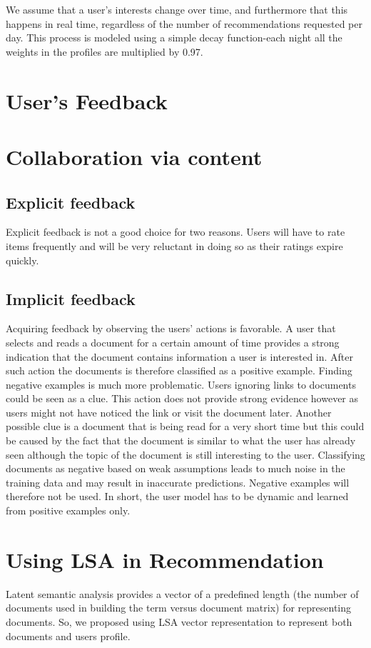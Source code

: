 We assume that a user's interests change over time, and furthermore that this happens in real time, regardless of the number of recommendations requested per day. This process is modeled using a simple decay function-each night all the weights in the profiles are multiplied by 0.97.
 
\section{User's Feedback}

\section{Collaboration via content}
\subsection{Explicit feedback}
Explicit feedback is not a good choice for two reasons. Users will have to rate items frequently and will be very reluctant in doing so as their ratings expire quickly.

\subsection{Implicit feedback}
Acquiring feedback by observing the users’ actions is favorable. A user that selects and reads a document for a certain amount of time provides a strong indication that the document contains information a user is interested in. After such action the documents is therefore classified as a positive example. Finding negative examples is much more problematic. Users ignoring links to documents could be seen as a clue. This action does not provide strong evidence however as users might not have noticed the link or visit the document later. Another possible clue is a document that is being read for a very short time but this could be caused by the fact that the document is similar to what the user has already seen although the topic of the document is still interesting to the user. Classifying documents as negative based on weak assumptions leads to much noise in the training data and may result in inaccurate predictions. Negative examples will therefore not be used. In short, the user model has to be dynamic and learned from positive examples only.
\section{Using LSA in Recommendation}
Latent semantic analysis provides a vector of a predefined length (the number of documents used in building the term versus document matrix) for representing documents.
So, we proposed using LSA vector representation to represent both documents and users profile.
